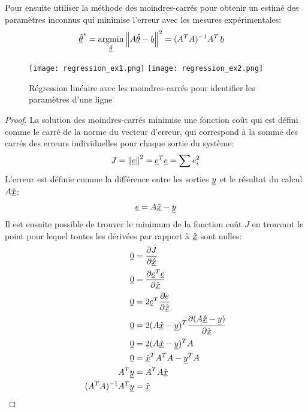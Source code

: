 Pour ensuite utiliser la méthode des moindres-carrés pour obtenir un estimé des paramètres inconnus qui minimise l'erreur avec les mesures expérimentales:
\begin{align}
\col{\hat{\theta}}^* &= \operatornamewithlimits{argmin}\limits_{\col{\hat{\theta}}} \left\| A \col{\hat{\theta}} - \col{b} \right\|^2
= (A^T A)^{-1} A^T \, \col{b}
\end{align}



\begin{example}
\begin{figure}[H]
	\centering
		\texttt{[image: regression\_ex1.png]}
		\texttt{[image: regression\_ex2.png]}
	\caption{Régression linéaire avec les moindres-carrés pour identifier les paramètres d'une ligne}
	\label{fig:regression-ex1}
\end{figure}
\end{example}

\begin{proof}
La solution des moindres-carrés minimise une fonction coût qui est défini comme le carré de la norme du vecteur d'erreur, qui correspond à la somme des carrés des erreurs individuelles pour chaque sortie du système:
\begin{align}
J = \left\| \underline{e} \right\|^2  = \underline{e}^T\underline{e} = \sum{ e_i^2}
\end{align}
L'erreur est définie comme la différence entre les sorties $\underline{y}$ et le résultat du calcul $A \underline{\hat{x}}$:
\begin{align}
\underline{e} = A \underline{\hat{x}} - \underline{y}
\end{align}
Il est ensuite possible de trouver le minimum de la fonction coût $J$ en trouvant le point pour lequel toutes les dérivées par rapport à $\underline{\hat{x}}$ sont nulles:
\begin{align}
\underline{0} &= \frac{\partial J}{\partial \underline{\hat{x}}} \\
\underline{0} &= \frac{\partial \underline{e}^T\underline{e}}{\partial \underline{\hat{x}}} \\
\underline{0} &= 2 \underline{e}^T \frac{\partial e }{\partial \underline{\hat{x}}} \\
\underline{0} &= 2 ( A \underline{\hat{x}} -\underline{y} )^T \frac{\partial (A \underline{\hat{x}} -\underline{y}) }{\partial \underline{\hat{x}}} \\
\underline{0} &= 2 ( A \underline{\hat{x}} -\underline{y}  )^T A  \\
\underline{0} &=  \underline{\hat{x}}^T A^T A  - \underline{y}^T A   \\
A^T \underline{y} &= A^T A \underline{\hat{x}} \\
(A^T A)^{-1} A^T \underline{y} &= \underline{\hat{x}} 
\end{align}
\end{proof}


